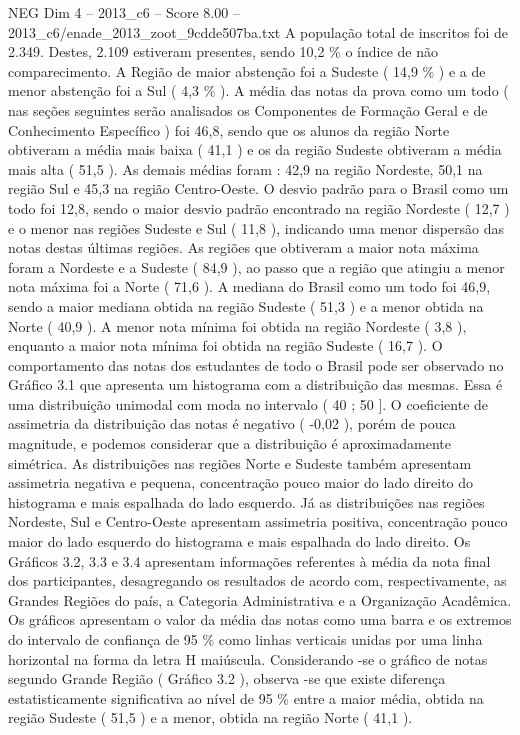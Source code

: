 \begin{textsample}{NEG Dim 4 – 2013\_c6 – Score 8.00 – 2013\_c6/enade\_2013\_zoot\_9cdde507ba.txt}
A população total de inscritos foi de 2.349.
Destes, 2.109 estiveram presentes, sendo 10,2 \% o índice de não comparecimento.
A Região de maior abstenção foi a Sudeste ( 14,9 \% ) e a de menor abstenção foi a Sul ( 4,3 \% ).
A média das notas da prova como um todo ( nas seções seguintes serão analisados os Componentes de Formação Geral e de Conhecimento Específico ) foi 46,8, sendo que os alunos da região Norte obtiveram a média mais baixa ( 41,1 ) e os da região Sudeste obtiveram a média mais alta ( 51,5 ).
As demais médias foram : 42,9 na região Nordeste, 50,1 na região Sul e 45,3 na região Centro-Oeste.
O desvio padrão para o Brasil como um todo foi 12,8, sendo o maior desvio padrão encontrado na região Nordeste ( 12,7 ) e o menor nas regiões Sudeste e Sul ( 11,8 ), indicando uma menor dispersão das notas destas últimas regiões.
As regiões que obtiveram a maior nota máxima foram a Nordeste e a Sudeste ( 84,9 ), ao passo que a região que atingiu a menor nota máxima foi a Norte ( 71,6 ).
A mediana do Brasil como um todo foi 46,9, sendo a maior mediana obtida na região Sudeste ( 51,3 ) e a menor obtida na Norte ( 40,9 ).
A menor nota mínima foi obtida na região Nordeste ( 3,8 ), enquanto a maior nota mínima foi obtida na região Sudeste ( 16,7 ).
O comportamento das notas dos estudantes de todo o Brasil pode ser observado no Gráfico 3.1 que apresenta um histograma com a distribuição das mesmas.
Essa é uma distribuição unimodal com moda no intervalo ( 40 ; 50 ].
O coeficiente de assimetria da distribuição das notas é negativo ( -0,02 ), porém de pouca magnitude, e podemos considerar que a distribuição é aproximadamente simétrica.
As distribuições nas regiões Norte e Sudeste também apresentam assimetria negativa e pequena, concentração pouco maior do lado direito do histograma e mais espalhada do lado esquerdo.
Já as distribuições nas regiões Nordeste, Sul e Centro-Oeste apresentam assimetria positiva, concentração pouco maior do lado esquerdo do histograma e mais espalhada do lado direito.
Os Gráficos 3.2, 3.3 e 3.4 apresentam informações referentes à média da nota final dos participantes, desagregando os resultados de acordo com, respectivamente, as Grandes Regiões do país, a Categoria Administrativa e a Organização Acadêmica.
Os gráficos apresentam o valor da média das notas como uma barra e os extremos do intervalo de confiança de 95 \% como linhas verticais unidas por uma linha horizontal na forma da letra H maiúscula.
Considerando -se o gráfico de notas segundo Grande Região ( Gráfico 3.2 ), observa -se que existe diferença estatisticamente significativa ao nível de 95 \% entre a maior média, obtida na região Sudeste ( 51,5 ) e a menor, obtida na região Norte ( 41,1 ).

\end{textsample}
